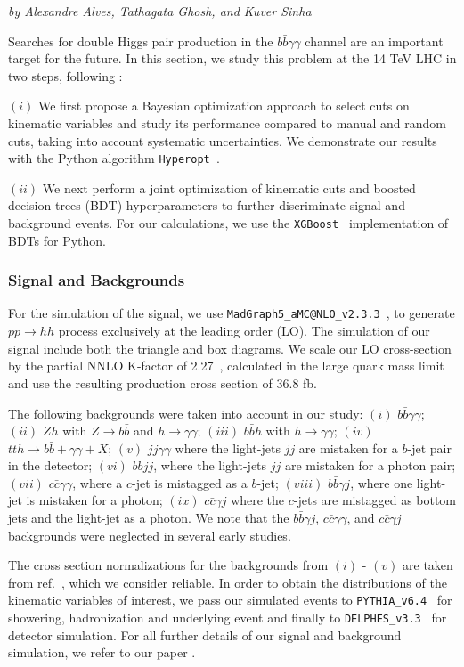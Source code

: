 \textit{by Alexandre Alves, Tathagata Ghosh, and Kuver Sinha}

Searches for double Higgs pair production in the $b\bar{b}\gamma\gamma$ channel are an important target for the future. In this section, we study this problem at the 14 TeV LHC in two steps, following \cite{Alves:2017ued}: 

$(i)$ We first propose a Bayesian optimization approach to select cuts on kinematic variables and study its performance compared to manual and random cuts, taking into account systematic uncertainties. We demonstrate our results with the Python algorithm \texttt{Hyperopt }.

$(ii)$ We next perform a joint optimization of kinematic cuts and boosted decision trees (BDT) hyperparameters to further discriminate signal and background events.  For our calculations, we use the \texttt{XGBoost }  implementation of BDTs for Python. 

\subsubsection{Signal and Backgrounds}

For the simulation of the signal, we use {\tt MadGraph5\_aMC@NLO\_v2.3.3}~\cite{MG5}, to generate $p p \rightarrow h h$ process exclusively at the leading order (LO). The simulation of our signal
include both the triangle and box diagrams. We scale our LO cross-section by the partial NNLO K-factor of 2.27~\cite{deFlorian:2013uza}, calculated in the large quark mass limit and use the resulting production cross section of 36.8 fb.

The following backgrounds were taken into account in our study: $(i)$ $b\bar{b}\gamma\gamma$; $(ii)$ $Zh$ with $Z \rightarrow b\bar{b}$ and $h \rightarrow \gamma\gamma$; $(iii)$ $b\bar{b}h$ with $h\to\gamma\gamma$; $(iv)$
$t\bar{t}h \rightarrow b\bar{b}+\gamma\gamma+X$; $(v)$ $jj\gamma\gamma$ where the light-jets $jj$ are mistaken for a $b$-jet pair in the detector; $(vi)$ $b\bar{b}jj$,  where the light-jets $jj$ are mistaken for a photon pair; $(vii)$ $c\bar{c}\gamma\gamma$, where a $c$-jet is mistagged as a $b$-jet; $(viii)$ $b\bar{b}\gamma j$, where one light-jet is mistaken for a photon; $(ix)$ $c\bar{c}\gamma j$ where the $c$-jets are mistagged as bottom jets and the light-jet as a photon. We note that the $b\bar{b}\gamma j$, $c\bar{c}\gamma\gamma$, and $c\bar{c}\gamma j$ backgrounds were neglected in several early studies. 
 
The cross section normalizations for the backgrounds from $(i)$ - $(v)$ are taken from ref.~\cite{Azatov:2015oxa}, which we consider reliable. In order to obtain the distributions of the kinematic variables of interest, we pass our simulated events to {\tt PYTHIA\_v6.4}~\cite{pythia} for showering, hadronization and underlying event and finally to {\tt DELPHES\_v3.3}~\cite{delphes} for detector simulation. For all further details of our signal and background simulation, we refer to our paper \cite{Alves:2017ued}. 

